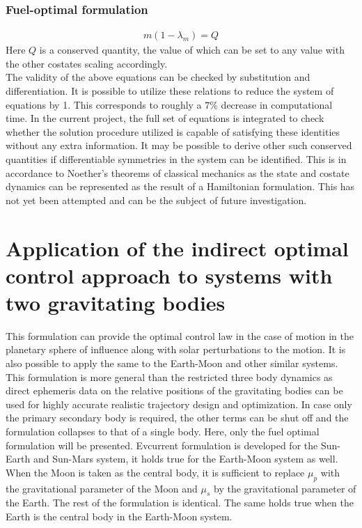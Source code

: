 \subsubsection{Fuel-optimal formulation}
\begin{align}
	m(1-\lambda_m)=Q
\end{align}
Here $Q$ is a conserved quantity, the value of which can be set to any value with the other costates scaling accordingly.\\
The validity of the above equations can be checked by substitution and differentiation. It is possible to utilize these relations to reduce the system of equations by 1. This corresponds to roughly a $7\%$ decrease in computational time. In the current project, the full set of equations is integrated to check whether the solution procedure utilized is capable of satisfying these identities without any extra information. It may be possible to derive other such conserved quantities if differentiable symmetries in the system can be identified. This is in accordance to Noether's theorems of classical mechanics as the state and costate dynamics can be represented as the result of a Hamiltonian formulation. This has not yet been attempted and can be the subject of future investigation.

\section{Application of the indirect optimal control approach to systems with two gravitating bodies}
This formulation can provide the optimal control law in the case of motion in the planetary sphere of influence along with solar perturbations to the motion. It is also possible to apply the same to the Earth-Moon and other similar systems. This formulation is more general than the restricted three body dynamics as direct ephemeris data on the relative positions of the gravitating bodies can be used for highly accurate realistic trajectory design and optimization. In case only the primary secondary body is required, the other terms can be shut off and the formulation collapses to that of a single body. Here, only the fuel optimal formulation will be presented. Evcurrent formulation is developed for the Sun-Earth and Sun-Mars system, it holds true for the Earth-Moon system as well. When the Moon is taken as the central body, it is sufficient to replace $\mu_p$ with the gravitational parameter of the Moon and $\mu_s$ by the gravitational parameter of the Earth. The rest of the formulation is identical. The same holds true when the Earth is the central body in the Earth-Moon system.
